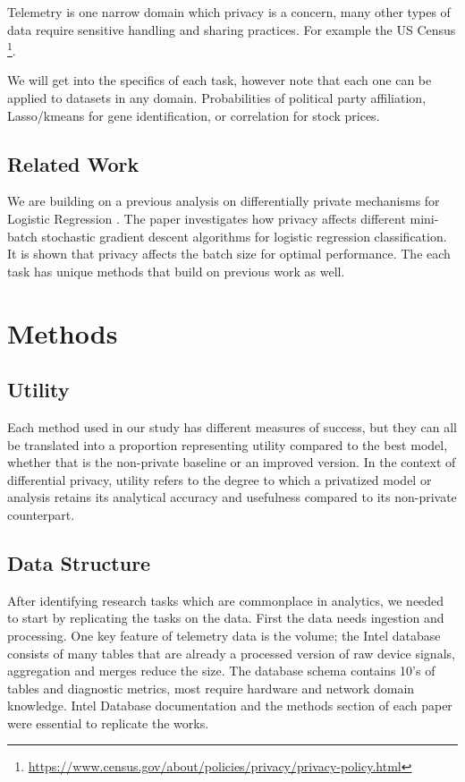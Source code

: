 \documentclass[12pt,letterpaper]{article}
\begin{document}
Telemetry is one narrow domain which privacy is a concern, many other types of data require sensitive handling and sharing practices. For example the US Census \footnote{\url{https://www.census.gov/about/policies/privacy/privacy-policy.html}}. 

We will get into the specifics of each task, however note that each one can be applied to datasets in any domain. Probabilities of political party affiliation, Lasso/kmeans for gene identification, or correlation for stock prices. 

\subsection{Related Work}

We are building on a previous analysis on differentially private mechanisms for Logistic Regression \cite{qtr1proj}. The paper investigates how privacy affects different mini-batch stochastic gradient descent algorithms for logistic regression classification. It is shown that privacy affects the batch size for optimal performance. The each task has unique methods that build on previous work as well. 


\section{Methods}

\subsection{Utility}

Each method used in our study has different measures of success, but they can all be translated into a proportion representing utility compared to the best model, whether that is the non-private baseline or an improved version. In the context of differential privacy, utility refers to the degree to which a privatized model or analysis retains its analytical accuracy and usefulness compared to its non-private counterpart.


\subsection{Data Structure}

After identifying research tasks which are commonplace in analytics, we needed to start by replicating the tasks on the data. First the data needs ingestion and processing. One key feature of telemetry data is the volume; the Intel database consists of many tables that are already a processed version of raw device signals, aggregation and merges reduce the size. The database schema contains 10's of tables and diagnostic metrics, most require hardware and network domain knowledge. Intel Database documentation and the methods section of each paper were essential to replicate the works.
\end{document}
